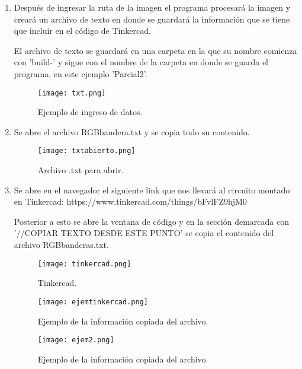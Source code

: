 \documentclass{article}
\begin{document}
\begin{enumerate}
\newpage
\item Después de ingresar la ruta de la imagen el programa procesará la imagen y creará un archivo de texto en donde se guardará la información que se tiene que incluir en el código de Tinkercad.

El archivo de texto se guardará en una carpeta en la que su nombre comienza con 'build-' y sigue con el nombre de la carpeta en donde se guarda el programa, en este ejemplo 'Parcial2'.

\begin{figure}[h]
\texttt{[image: txt.png]}
\centering
\caption{Ejemplo de ingreso de datos.}
\label{fig:txt}
\end{figure}
 \newpage
\item Se abre el archivo RGBbandera.txt y se copia todo su contenido.

\begin{figure}[h]
\texttt{[image: txtabierto.png]}
\centering
\caption{Archivo .txt para abrir.}
\label{fig:txtabierto}
\end{figure}

\item Se abre en el navegador el siguiente link que nos llevará al circuito montado en Tinkercad: https://www.tinkercad.com/things/bFvlFZ9hjM0

Posterior a esto se abre la ventana de código y en la sección demarcada con '//COPIAR TEXTO DESDE  ESTE PUNTO' se copia el contenido del archivo RGBbanderas.txt.

\begin{figure}[h]
\texttt{[image: tinkercad.png]}
\centering
\caption{Tinkercad.}
\label{fig:tinkercad}
\end{figure}

\begin{figure}[h]
\texttt{[image: ejemtinkercad.png]}
\centering
\caption{Ejemplo de la información copiada del archivo.}
\label{fig:ejemtinkercad}
\end{figure}

\begin{figure}[h]
\texttt{[image: ejem2.png]}
\centering
\caption{Ejemplo de la información copiada del archivo.}
\label{fig:ejem2}
\end{figure}


\end{enumerate}
\end{document}
